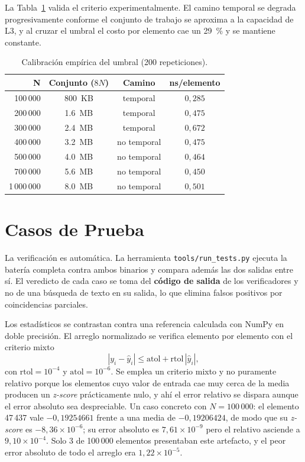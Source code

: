 \documentclass[journal]{IEEEtran}
\begin{document}
La Tabla~\ref{tab:calibracion} valida el criterio experimentalmente. El
camino temporal se degrada progresivamente conforme el conjunto de trabajo
se aproxima a la capacidad de L3, y al cruzar el umbral el costo por
elemento cae un \SI{29}{\percent} y se mantiene constante.

\begin{table}[h]
\centering
\caption{Calibración empírica del umbral (200 repeticiones).}
\label{tab:calibracion}
\footnotesize
\setlength{\tabcolsep}{4pt}
\begin{tabular}{|r|c|c|c|}
\hline
\textbf{N} & \textbf{Conjunto ($8N$)} & \textbf{Camino} & \textbf{ns/elemento} \\ \hline
100\,000   & \SI{800}{KB}  & temporal     & $0,285$ \\ \hline
200\,000   & \SI{1,6}{MB}  & temporal     & $0,475$ \\ \hline
300\,000   & \SI{2,4}{MB}  & temporal     & $0,672$ \\ \hline
400\,000   & \SI{3,2}{MB}  & no temporal  & $0,475$ \\ \hline
500\,000   & \SI{4,0}{MB}  & no temporal  & $0,464$ \\ \hline
700\,000   & \SI{5,6}{MB}  & no temporal  & $0,450$ \\ \hline
1\,000\,000 & \SI{8,0}{MB} & no temporal  & $0,501$ \\ \hline
\end{tabular}
\end{table}

\section{Casos de Prueba}
\label{sec:casos}

La verificación es automática. La herramienta \texttt{tools/run\_tests.py}
ejecuta la batería completa contra ambos binarios y compara además las
dos salidas entre sí. El veredicto de cada caso se toma del
\textbf{código de salida} de los verificadores y no de una búsqueda de
texto en su salida, lo que elimina falsos positivos por coincidencias
parciales.

Los estadísticos se contrastan contra una referencia calculada con NumPy
en doble precisión. El arreglo normalizado se verifica elemento por
elemento con el criterio mixto
\begin{equation}
  |y_i - \hat{y}_i| \le \mathrm{atol} + \mathrm{rtol}\,|\hat{y}_i|,
  \label{eq:criterio}
\end{equation}
con $\mathrm{rtol} = 10^{-4}$ y $\mathrm{atol} = 10^{-6}$. Se emplea un
criterio mixto y no puramente relativo porque los elementos cuyo valor de
entrada cae muy cerca de la media producen un \textit{z-score}
prácticamente nulo, y ahí el error relativo se dispara aunque el error
absoluto sea despreciable. Un caso concreto con $N = 100\,000$: el
elemento 47\,437 vale $-0,19254661$ frente a una media de
$-0,19206424$, de modo que su \textit{z-score} es $-8,36\times10^{-6}$;
su error absoluto es $7,61\times10^{-9}$ pero el relativo asciende a
$9,10\times10^{-4}$. Solo 3 de 100\,000 elementos presentaban este
artefacto, y el peor error absoluto de todo el arreglo era
$1,22\times10^{-5}$.
\end{document}
